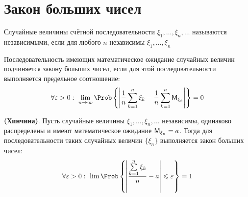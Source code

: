 \section{Закон больших чисел}
\begin{definition}
	Случайные величины счётной последовательности $\xi_1, \ldots, \xi_n, \ldots$ называются независимыми, если для любого $n$ независимы $\xi_1, \ldots, \xi_n$
\end{definition}
\begin{definition}
	Последовательность имеющих математическое ожидание случайных величин подчиняется закону больших чисел, если для этой последовательности выполняется предельное соотношение:
\[
	\forall \varepsilon > 0: \ \lim\limits_{n \to \infty} \Prob \left\{ \left| \frac{1}{n} \sum\limits_{k = 1}^{n} \xi_k - \frac{1}{n} \sum\limits_{k = 1}^{n} \MExpect_{\xi_k} \right| \right\} = 0
\]
\end{definition}
\begin{theorem}
	\textbf{(Хинчина)}. Пусть случайные величины $\xi_1, \ldots, \xi_n, \ldots$ независимы, одинаково распределены и имеют математическое ожидание $ \mathsf{M}_{\xi_n} = a $. Тогда для последовательности таких случайных величин $\{ \xi_n \}$ выполняется закон больших чисел:
\[
	\forall \varepsilon > 0: \ \lim \Prob \left\{ \left| \frac{\sum\limits_{k = 1}^{n} \xi_k}{n} - a \right| \leqslant \varepsilon \right\} = 1 
\]
\end{theorem}
